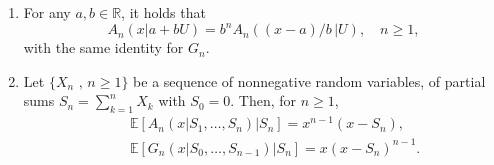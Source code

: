 \begin{prop}\label{prop:Appell_AG_polynomials_properties}
\begin{enumerate}
\item For any $a,b\in \mathbb{R}$, it holds that
\begin{equation}
A_{n}(x|a+bU) = b^n A_n\left((x-a)/b \, |U\right), \quad n\geq 1, \label{eq:LinearTransform}
\end{equation}
with the same identity for $G_n$.
\item Let $\{X_{n}\text{ , }n\geq1\}$ be a sequence of \iid nonnegative random variables, of partial sums $S_{n}=\sum_{k=1}^{n}X_{k}$ with $S_0=0$. Then, for $n\geq 1$,
\begin{eqnarray}
&&\mathbb{E} \left[A_{n}(x|S_{1},\ldots,S_{n})\vert S_{n}\right] = x^{n-1}(x-S_{n}), \label{eq:ExplicitExpressionPartialSumsAppellPolynomials}\\
&&\mathbb{E}\left[G_{n}(x|S_{0},\ldots,S_{n-1})\vert S_{n}\right] = x(x-S_{n})^{n-1}.    \label{eq:ExplicitExpressionPartialSumsAGPolynomials}
\end{eqnarray}
\end{enumerate} 
\end{prop}
